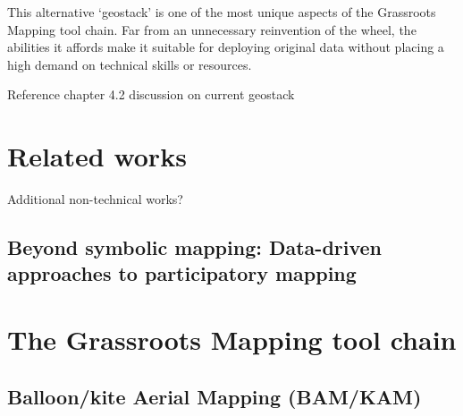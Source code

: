 \documentclass[11pt]{report}
\begin{document}
This alternative `geostack' is one of the most unique aspects of the Grassroots Mapping tool chain. Far from an unnecessary reinvention of the wheel, the abilities it affords make it suitable for deploying original data without placing a high demand on technical skills or resources. 

Reference chapter 4.2 discussion on current geostack 


\chapter{Related works}

Additional non-technical works?

\section{Beyond symbolic mapping: Data-driven approaches to participatory mapping}


\chapter{The Grassroots Mapping tool chain}
\section{Balloon/kite Aerial Mapping (BAM/KAM)}
\end{document}
